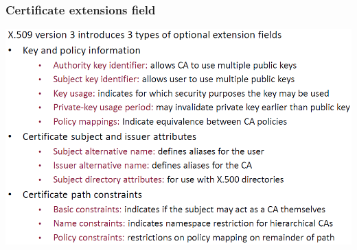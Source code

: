 \documentclass[12pt]{article}
\begin{document}
 
 \subsubsection{Certificate extensions field}
 \includegraphics[width=\linewidth]{./slides/L5P5EXT.PNG}
 
\end{document}
